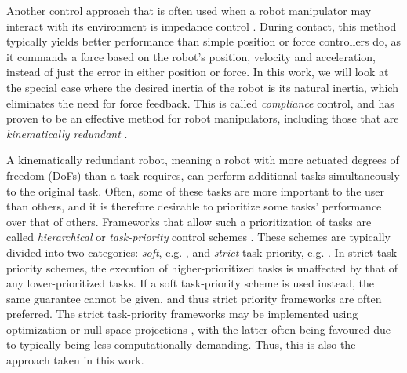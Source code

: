 \documentclass[../main.tex]{subfiles}
\begin{document}
Another control approach that is often used when a robot manipulator may interact with its environment is impedance control \cite{hoganImpedanceControlApproach1984}. During contact, this method typically yields better performance than simple position or force controllers do, as it commands a force based on the robot's position, velocity and acceleration, instead of just the error in either position or force. %
In this work, we will look at the special case where the desired inertia of the robot is its natural inertia, which eliminates the need for force feedback.
This is called \textit{compliance} control, and has proven to be an effective method for robot manipulators, including those that are \textit{kinematically redundant} \cite{albu-schafferCartesianImpedanceControl2003}. %

A kinematically redundant robot, meaning a robot with more actuated degrees of freedom (DoFs) than a task requires, can perform additional tasks simultaneously to the original task.
Often, some of these tasks are more important to the user than others, and it is therefore desirable to prioritize some tasks' performance over that of others. Frameworks that allow such a prioritization of tasks are called \textit{hierarchical} or \textit{task-priority} control schemes \cite{nakamuraTaskPriorityBasedRedundancy1987}.
These schemes are typically divided into two categories: \textit{soft}, e.g. \cite{saliniSynthesisComplexHumanoid2011}, and \textit{strict} task priority, e.g. \cite{ottPrioritizedMultiTaskCompliance2015}. 
In strict task-priority schemes, the execution of higher-prioritized tasks is unaffected by that of any lower-prioritized tasks.
If a soft task-priority scheme is used instead, the same guarantee cannot be given, and thus strict priority frameworks are often preferred.
The strict task-priority frameworks may be implemented using optimization \cite{kanounKinematicControlRedundant2011} or null-space projections \cite{khatibUnifiedApproachMotion1987}, with the latter often being favoured due to typically being less computationally demanding. Thus, this is also the approach taken in this work.
\end{document}
